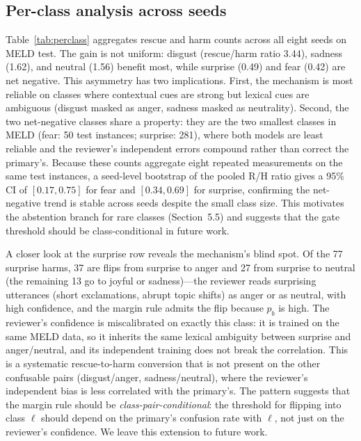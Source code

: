 \documentclass[final,5p,times,twocolumn]{elsarticle}
\begin{document}
\subsection{Per-class analysis across seeds}
\label{sec:perclass}
Table~\ref{tab:perclass} aggregates rescue and harm counts across all eight
seeds on MELD test. The gain is not uniform: disgust (rescue/harm ratio
3.44), sadness (1.62), and neutral (1.56) benefit most, while surprise
(0.49) and fear (0.42) are net negative. This asymmetry has two
implications. First, the mechanism is most reliable on classes where
contextual cues are strong but lexical cues are ambiguous (disgust masked
as anger, sadness masked as neutrality). Second, the two net-negative
classes share a property: they are the two smallest classes in MELD
(fear: 50 test instances; surprise: 281), where both models are least
reliable and the reviewer's independent errors compound rather than correct
the primary's. Because these counts aggregate eight repeated measurements on
the same test instances, a seed-level bootstrap of the pooled R/H ratio
gives a 95\% CI of $[0.17, 0.75]$
for fear and $[0.34, 0.69]$ for surprise, confirming the net-negative trend
is stable across seeds despite the small class size. This motivates the
abstention branch for rare classes (Section~5.5) and suggests that the gate
threshold should be class-conditional in future work.

A closer look at the surprise row reveals the mechanism's blind spot. Of
the 77 surprise harms, 37 are flips from surprise to anger and 27 from
surprise to neutral (the remaining 13 go to joyful or sadness)---the
reviewer reads surprising utterances (short
exclamations, abrupt topic shifts) as anger or as neutral, with high
confidence, and the margin rule admits the flip because $p_b$ is high. The
reviewer's confidence is miscalibrated on exactly this class: it is trained
on the same MELD data, so it inherits the same lexical ambiguity between
surprise and anger/neutral, and its independent training does not break the
correlation. This is a systematic rescue-to-harm conversion that is not
present on the other confusable pairs (disgust/anger, sadness/neutral),
where the reviewer's independent bias is less correlated with the primary's.
The pattern suggests that the margin rule should be
\emph{class-pair-conditional}: the threshold for flipping into class $\ell$
should depend on the primary's confusion rate with $\ell$, not just on the
reviewer's confidence. We leave this extension to future work.
\end{document}
